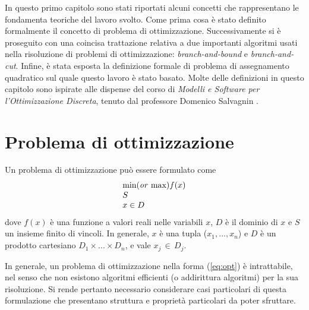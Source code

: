 In questo primo capitolo sono stati riportati alcuni concetti che rappresentano le fondamenta teoriche del
lavoro svolto. Come prima cosa è stato definito formalmente il concetto di problema di ottimizzazione. Successivamente
si è proseguito con una coincisa trattazione relativa a due importanti algoritmi usati nella risoluzione di 
problemi di ottimizzazione: \textit{branch-and-bound} e \textit{branch-and-cut}. Infine, è stata esposta la
definizione formale di problema di assegnamento quadratico sul quale questo lavoro è stato basato. Molte delle definizioni in questo capitolo sono ispirate alle 
dispense del corso di \textsl{Modelli e Software per l'Ottimizzazione Discreta}, tenuto dal professore 
Domenico Salvagnin \cite{salvagnin1}\cite{salvagnin2}.

\section{Problema di ottimizzazione}
Un problema di ottimizzazione può essere formulato come 
\begin{align}
	\label{eq:opt}
	\begin{array}{l}
      \text{min(\textit{or} max)}f(x)\\
      S	\\
      x \in D
    \end{array}
\end{align}
dove $f(x)$ è una funzione a valori reali nelle variabili $x$, $D$ è il dominio di $x$ e $S$ un insieme finito di vincoli. In generale,  
$x$ è una tupla ($x_1,...,x_n$) e $D$ è un prodotto cartesiano $D_1 \times ... \times D_n$, e vale $x_j \, \in \, D_j$. 

In generale, un problema di ottimizzazione nella forma (\ref{eq:opt}) è intrattabile, nel senso che non esistono
algoritmi efficienti (o addirittura algoritmi) per la sua risoluzione.
Si rende pertanto necessario considerare casi particolari di questa formulazione che presentano struttura e proprietà
particolari da poter sfruttare.

\newpage
